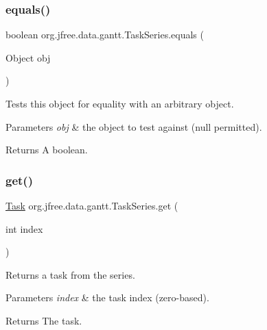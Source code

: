 \subsubsection{\texorpdfstring{equals()}{equals()}}
{\footnotesize\ttfamily boolean org.\+jfree.\+data.\+gantt.\+Task\+Series.\+equals (\begin{DoxyParamCaption}\item[{Object}]{obj }\end{DoxyParamCaption})}

Tests this object for equality with an arbitrary object.


\begin{DoxyParams}{Parameters}
{\em obj} & the object to test against ({\ttfamily null} permitted).\\
\hline
\end{DoxyParams}
\begin{DoxyReturn}{Returns}
A boolean. 
\end{DoxyReturn}
\mbox{\label{classorg_1_1jfree_1_1data_1_1gantt_1_1_task_series_a2c6624b3d87e494c065686258dc6af0c}} 
\subsubsection{\texorpdfstring{get()}{get()}\hspace{0.1cm}{\footnotesize\ttfamily [1/2]}}
{\footnotesize\ttfamily \mbox{\hyperlink{classorg_1_1jfree_1_1data_1_1gantt_1_1_task}{Task}} org.\+jfree.\+data.\+gantt.\+Task\+Series.\+get (\begin{DoxyParamCaption}\item[{int}]{index }\end{DoxyParamCaption})}

Returns a task from the series.


\begin{DoxyParams}{Parameters}
{\em index} & the task index (zero-\/based).\\
\hline
\end{DoxyParams}
\begin{DoxyReturn}{Returns}
The task. 
\end{DoxyReturn}
\mbox{\label{classorg_1_1jfree_1_1data_1_1gantt_1_1_task_series_a67bcf4b0e29966afc508ecfa2a400266}} 
